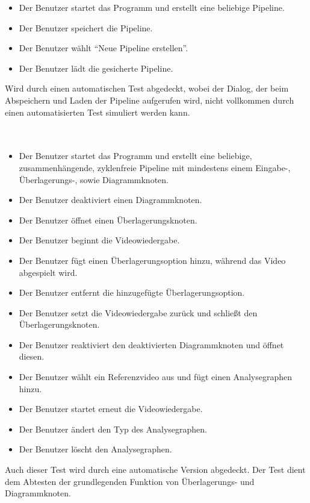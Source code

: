 \begin{itemize}
	\item Der Benutzer startet das Programm und erstellt eine beliebige Pipeline.
	\item Der Benutzer speichert die Pipeline.
	\item Der Benutzer wählt ``Neue Pipeline erstellen''.
	\item Der Benutzer lädt die gesicherte Pipeline.
\end{itemize}

Wird durch einen automatischen Test abgedeckt, wobei der Dialog, der beim Abspeichern und Laden der Pipeline aufgerufen wird, nicht vollkommen durch einen automatisierten Test simuliert werden kann.

\paragraph{}

\paragraph{} ~\\
 
\begin{itemize}
	\item Der Benutzer startet das Programm und erstellt eine beliebige, zusammenhängende, zyklenfreie Pipeline mit mindestens einem Eingabe-, Überlagerungs-, sowie Diagrammknoten.
	\item Der Benutzer deaktiviert einen Diagrammknoten.
	\item Der Benutzer öffnet einen Überlagerungsknoten.
	\item Der Benutzer beginnt die Videowiedergabe.
	\item Der Benutzer fügt einen Überlagerungsoption hinzu, während das Video abgespielt wird.
	\item Der Benutzer entfernt die hinzugefügte Überlagerungsoption.
	\item Der Benutzer setzt die Videowiedergabe zurück und schließt den Überlagerungsknoten.
	\item Der Benutzer reaktiviert den deaktivierten Diagrammknoten und öffnet diesen.
	\item Der Benutzer wählt ein Referenzvideo aus und fügt einen Analysegraphen hinzu.
	\item Der Benutzer startet erneut die Videowiedergabe.
	\item Der Benutzer ändert den Typ des Analysegraphen.
	\item Der Benutzer löscht den Analysegraphen.
\end{itemize}

Auch dieser Test wird durch eine automatische Version abgedeckt. Der Test dient dem Abtesten der grundlegenden Funktion von Überlagerungs- und Diagrammknoten.
